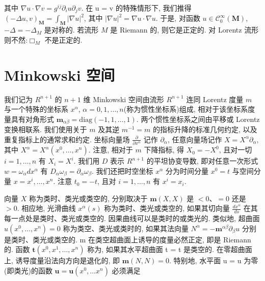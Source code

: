 其中 $\nabla u\cdot\nabla v = g^{ij}\partial_{i}u\partial_{j}v$. 在 u = v 的特殊情形下, 我们推得 $(-\Delta u, v)_{\mathbf{M}} = \int_{\mathbf{M}}|\nabla u|^{2}$, 其中 $|\nabla u|^{2} = \nabla u\cdot\nabla u$. 于是, 对函数 $u \in \mathcal{C}_{0}^{\infty}(\mathbf{M})$, $-\Delta = -\Delta_{M}$ 是对称的. 若流形 $M$ 是 Riemann 的, 则它是正定的. 对 Lorentz 流形则不然:$\Box_{M}$ 不是正定的.


\section{Minkowski 空间}


我们记为 $R^{n+1}$ 的 $n+1$ 维 Minkowski 空间由流形 $R^{n+1}$ 连同 Lorentz 度量 $m$ 与一个特殊的坐标系 $x^{\alpha}$, $\alpha = 0, 1, \ldots, n$(称为惯性坐标系)组成, 相对于该坐标系度量具有对角形式 $\mathbf{m}_{\alpha\beta} = \text{diag}(-1, 1, \ldots, 1)$. 两个惯性坐标系之间由平移或 Lorentz 变换相联系. 我们使用关于 $m$ 及其逆 $m^{-1} = m$ 的指标升降的标准几何约定, 以及重复指标上的通常求和约定. 坐标向量场 $\frac{\partial}{\partial x^{\alpha}}$ 记作 $\partial_{\alpha}$, 任意向量场记作 $X = X^{\alpha}\partial_{\alpha}$, 其中 $X^{\alpha} = X^{\alpha}(x^{0}, \ldots, x^{n})$. 注意, 相对于 $m$ 下降指标, 得 $X_{0} = -X^{0}$, 且对一切 $i = 1, \ldots, n$ 有 $X_{i} = X^{i}$. 我们用 $D$ 表示 $R^{n+1}$ 的平坦协变导数, 即对任意一次形式 $w = \omega_{\alpha}dx^{\alpha}$ 有 $D_{\alpha}\omega_{\beta} = \partial_{\alpha}\omega_{\beta}$. 我们还把时空坐标 $x^{\alpha}$ 分为时间分量 $x^{0} = t$ 与空间分量 $x = x^{i}, \ldots, x^{n}$. 注意 $t_{0} = -t$, 且对 $i = 1, \ldots, n$ 有 $x^{i} = x_{i}$.

向量 $X$ 称为类时、类光或类空的, 分别取决于 $\mathbf{m}(X, X)$ 是 $<0$、$=0$ 还是 $>0$. 相应地, 光滑曲线 $x^{\alpha}(s)$ 称为类时、类光或类空的, 如果其切向量 $\frac{dx^{\alpha}}{ds}$ 在其每一点处是类时、类光或类空的. 因果曲线可以是类时的或类光的. 类似地, 超曲面 $u(x^{0}, \ldots, x^{n})=0$ 称为类空、类光或类时的, 如果其法向量 $N^{\alpha} = -\mathbf{m}^{\alpha\beta}\partial_{\beta}u$ 分别是类时、类光或类空的. m 在类空超曲面上诱导的度量必然正定, 即是 Riemann 的. 函数 $\mathbf{t}(x^{0}, x^{1}, \ldots, x^{n})$ 称为, 如果其水平超曲面 t = t 是类空的. 在零超曲面上, 诱导度量沿法向方向是退化的, 即 $\mathbf{m}(N, N) = 0$. 特别地, 水平面 u = u 为零(即类光)的函数 $\mathbf{u} = \mathbf{u}(x^{0}, \ldots x^{n})$ 必须满足

